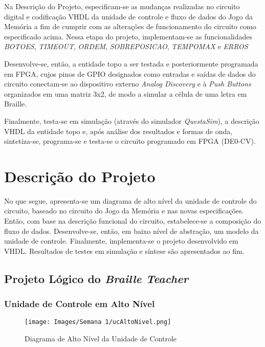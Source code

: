 \documentclass[amsmath,amssymb,floatfix]{report}
\begin{document}
Na Descrição do Projeto, especificam-se as mudanças realizadas no circuito digital e codificação VHDL da unidade de controle e fluxo de dados do Jogo da Memória a fim de cumprir com as alterações de funcionamento do circuito como especificado acima. Nessa etapa do projeto, implementam-se as funcionalidades \textit{BOTOES}, \textit{TIMEOUT}, \textit{ORDEM}, \textit{SOBREPOSICAO}, \textit{TEMPOMAX} e \textit{ERROS}

Desenvolve-se, então, a entidade topo a ser testada e posteriormente programada em FPGA, cujos pinos de GPIO designados como entradas e saídas de dados do circuito conectam-se ao dispositivo externo \textit{Analog Discovery} e à \textit{Push Buttons} organizados em uma matriz 3x2, de modo a simular a célula de uma letra em Braille.

Finalmente, testa-se em simulação (através do simulador \textit{QuestaSim}), a descrição VHDL da entidade topo e, após análise dos resultados e formas de onda, sintetiza-se, programa-se e testa-se o circuito programado em FPGA (DE0-CV).

\section{Descrição do Projeto}
\label{sec:descricaoDoProjeto1}

No que segue, apresenta-se um diagrama de alto nível da unidade de controle do circuito, baseado no circuito do Jogo da Memória e nas novas especificações. Então, com base na descrição funcional do circuito, estabelece-se a composição do fluxo de dados. Desenvolve-se, então, em baixo nível de abstração, um modelo da unidade de controle. Finalmente, implementa-se o projeto desenvolvido em VHDL. Resultados de testes em simulação e síntese são apresentados ao fim.

\subsection{Projeto Lógico do \textit{Braille Teacher}}
\label{subsec:projetoLogico1}

\subsubsection{Unidade de Controle em Alto Nível}
\label{subsubsec:ucAltoNivel1}

\begin{figure}[H]
    \centering
    \texttt{[image: Images/Semana 1/ucAltoNivel.png]}
    \caption{Diagrama de Alto Nível da Unidade de Controle}
    \label{fig:ucAltoNivel}
\end{figure}
\end{document}
